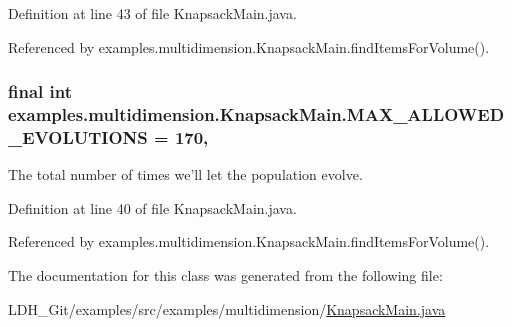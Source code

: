 Definition at line 43 of file Knapsack\-Main.\-java.



Referenced by examples.\-multidimension.\-Knapsack\-Main.\-find\-Items\-For\-Volume().

\hypertarget{classexamples_1_1multidimension_1_1_knapsack_main_a597b33abec9626da55cbb5865a1a5e0b}{
\subsubsection[{M\-A\-X\-\_\-\-A\-L\-L\-O\-W\-E\-D\-\_\-\-E\-V\-O\-L\-U\-T\-I\-O\-N\-S}]{\setlength{\rightskip}{0pt plus 5cm}final int examples.\-multidimension.\-Knapsack\-Main.\-M\-A\-X\-\_\-\-A\-L\-L\-O\-W\-E\-D\-\_\-\-E\-V\-O\-L\-U\-T\-I\-O\-N\-S = 170\hspace{0.3cm}{\ttfamily [static]}, {\ttfamily [private]}}}\label{classexamples_1_1multidimension_1_1_knapsack_main_a597b33abec9626da55cbb5865a1a5e0b}
The total number of times we'll let the population evolve. 

Definition at line 40 of file Knapsack\-Main.\-java.



Referenced by examples.\-multidimension.\-Knapsack\-Main.\-find\-Items\-For\-Volume().



The documentation for this class was generated from the following file\-:\begin{DoxyCompactItemize}
\item 
L\-D\-H\-\_\-\-Git/examples/src/examples/multidimension/\hyperlink{multidimension_2_knapsack_main_8java}{Knapsack\-Main.\-java}\end{DoxyCompactItemize}
